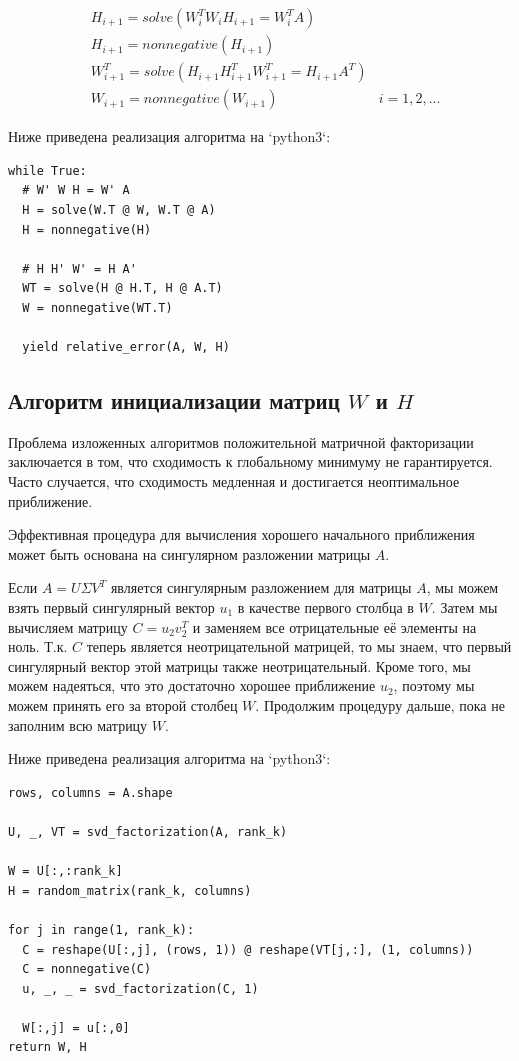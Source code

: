 \documentclass[14pt]{extarticle}
\makeatletter
\newcommand{\verbatimfont}[1]{\renewcommand{\verbatim@font}{\ttfamily#1}}
\makeatother
\begin{document}
\begin{align*}
	& H_{i+1} = solve(W_i^T W_i H_{i+1} = W_i^T A) \\
	& H_{i+1} = nonnegative(H_{i+1}) \\
	& W_{i+1}^T = solve(H_{i+1} H_{i+1}^T W_{i+1}^T = H_{i+1} A^T) \\
	& W_{i+1} = nonnegative(W_{i+1}) & i = 1, 2, ...
\end{align*}

Ниже приведена реализация алгоритма на `python3`:

\verbatimfont{\small}
\begin{verbatim}
while True:
  # W' W H = W' A
  H = solve(W.T @ W, W.T @ A)
  H = nonnegative(H)

  # H H' W' = H A'
  WT = solve(H @ H.T, H @ A.T)
  W = nonnegative(WT.T)

  yield relative_error(A, W, H)
\end{verbatim}


\newpage


\subsection{Алгоритм инициализации матриц $W$ и $H$}

Проблема изложенных алгоритмов положительной матричной факторизации заключается в том, что сходимость к глобальному минимуму не гарантируется. Часто случается, что сходимость медленная и достигается неоптимальное приближение. 

Эффективная процедура для вычисления хорошего начального приближения может быть основана на сингулярном разложении матрицы $A$.

Если $A = U \Sigma V^T $ является сингулярным разложением для матрицы $A$, мы можем взять первый сингулярный вектор $u_1$ в качестве первого столбца в $W$. Затем мы вычисляем матрицу $C = u_2 v_2^T$ и заменяем все отрицательные её элементы на ноль. Т.к. $C$ теперь является неотрицательной матрицей, то мы знаем, что первый сингулярный вектор этой матрицы также неотрицательный. Кроме того, мы можем надеяться, что это достаточно хорошее приближение $u_2$, поэтому мы можем принять его за второй столбец $W$. Продолжим процедуру дальше, пока не заполним всю матрицу $W$.

Ниже приведена реализация алгоритма на `python3`:

\verbatimfont{\small}
\begin{verbatim}
rows, columns = A.shape

U, _, VT = svd_factorization(A, rank_k)

W = U[:,:rank_k]
H = random_matrix(rank_k, columns)

for j in range(1, rank_k):
  C = reshape(U[:,j], (rows, 1)) @ reshape(VT[j,:], (1, columns))
  C = nonnegative(C)
  u, _, _ = svd_factorization(C, 1)

  W[:,j] = u[:,0]
return W, H
\end{verbatim}
\end{document}
